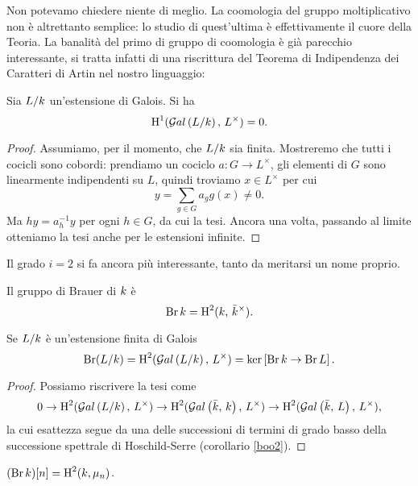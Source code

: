 Non potevamo chiedere niente di meglio. La coomologia del gruppo moltiplicativo non è altrettanto semplice: lo studio di quest'ultima è effettivamente il cuore della Teoria. La banalità del primo di gruppo di coomologia è già parecchio interessante, si tratta infatti di una riscrittura del Teorema di Indipendenza dei Caratteri di Artin nel nostro linguaggio:

\begin{theorem}[Hilbert 90]\label{H90}
	Sia $ L/k $ un'estensione di Galois. Si ha
	\[ \operatorname{H}^1(\mathcal{G}al\left(  L / k \right), \, L^\times) = 0. \]
\end{theorem}
\begin{proof}
	Assumiamo, per il momento, che $ L/k $ sia finita. Mostreremo che tutti i cocicli sono cobordi: prendiamo un cociclo $ a \colon G \to L^\times $, gli elementi di $ G $ sono linearmente indipendenti su $ L $, quindi troviamo $ x \in L^\times $ per cui
	\[ y = \sum_{g \in G} a_g g(x) \neq 0. \]
	Ma $ hy = a_h^{-1}y $ per ogni $ h \in G $, da cui la tesi.
	Ancora una volta, passando al limite otteniamo la tesi anche per le estensioni infinite. \todo[bruttino]
\end{proof}

Il grado $ i = 2 $ si fa ancora più interessante, tanto da meritarsi un nome proprio.
\begin{definition}
	Il gruppo di Brauer di $ k $ è $$  \operatorname{Br} k = \operatorname{H}^2(k, \, \bar{k}^\times).  $$
\end{definition}




\begin{lemma}\label{stronzetto}
	Se $ L/k $ è un'estensione finita di Galois
	\[ \operatorname{Br}(L/k) = \operatorname{H}^2(\mathcal{G}al\left( L/k \right), \, L^\times) = \ker  \left[\operatorname{Br} k \to \operatorname{Br} L\right].  \]
\end{lemma}
\begin{proof}
	Possiamo riscrivere la tesi come
	\[ 0 \to \operatorname{H}^2(\mathcal{G}al\left( L/k \right), \, L^\times) \to \operatorname{H}^2(\mathcal{G}al\left( \bar{k}, \, k \right), \, L^\times) \to \operatorname{H}^2(\mathcal{G}al\left( \bar{k}, \, L \right), \, L^\times), \]
	la cui esattezza segue da una delle successioni di termini di grado basso della successione spettrale di Hoschild-Serre (corollario \ref{boo2}).
\end{proof}

\begin{lemma}
	$ (\operatorname{Br} k) [n] = \operatorname{H}^2(k, \mu_n) $.
\end{lemma}

